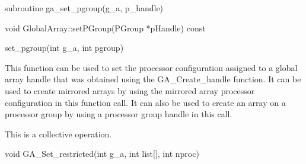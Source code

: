 \documentclass[12pt]{article}
\begin{document}
\begin{fapi}
\begin{fcode}
subroutine ga_set_pgroup(g_a, p_handle)
\end{fcode}
\begin{funcargs}
\end{funcargs}
\end{fapi}

\begin{cxxapi}
\begin{cxxcode}
void GlobalArray::setPGroup(PGroup *pHandle) const
\end{cxxcode}
\begin{funcargs}
\end{funcargs}
\end{cxxapi}

\begin{pyapi}
\begin{pycode}
set_pgroup(int g_a, int pgroup)
\end{pycode}
\end{pyapi}

\begin{desc}

  This function can be used to set the processor configuration
  assigned to a global array handle that was obtained using the
  GA_Create_handle function. It can be used to create mirrored arrays
  by using the mirrored array processor configuration in this function
  call. It can also be used to create an array on a processor group by
  using a processor group handle in this call.

  This is a collective operation.

\end{desc}


\begin{capi}
\begin{ccode}
void GA_Set_restricted(int g_a, int list[], int nproc)
\end{ccode}
\begin{funcargs}
\end{funcargs}
\end{capi}
\end{document}
